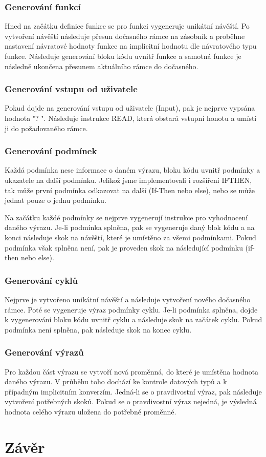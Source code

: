 \documentclass[11pt,a4paper]{article}
\begin{document}
    \subsubsection{Generování funkcí}
    Hned na začátku definice funkce se pro funkci vygeneruje unikátní návěští. Po vytvoření návěští následuje přesun dočasného rámce na zásobník a proběhne nastavení návratové hodnoty funkce na implicitní hodnotu dle návratového typu funkce. Následuje generování bloku kódu uvnitř funkce a samotná funkce je následně ukončena přesunem aktuálního rámce do dočasného.

    \subsubsection{Generování vstupu od uživatele}
    Pokud dojde na generování vstupu od uživatele (Input), pak je nejprve vypsána hodnota "? ". Následuje instrukce READ, která obstará vstupní honotu a umístí ji do požadovaného rámce.

    \subsubsection{Generování podmínek}
    Každá podmínka nese informace o daném výrazu, bloku kódu uvnitř podmínky a ukazatele na další podmínku. Jelikož jsme implementovali i rozšíření IFTHEN, tak může první podmínka odkazovat na další (If-Then nebo else), nebo se může jednat pouze o jednu podmínku.

    Na začátku každé podmínky se nejprve vygenerují instrukce pro vyhodnocení daného výrazu. Je-li podmínka splněna, pak se vygeneruje daný blok kódu a na konci následuje skok na návěští, které je umístěno za všemi podmínkami. Pokud podmínka však splněna není, pak je proveden skok na následující podmínku (if-then nebo else).

    \subsubsection{Generování cyklů}
    Nejprve je vytvořeno unikátní návěští a následuje vytvoření nového dočasného rámce. Poté se vygeneruje výraz podmínky cyklu. Je-li podmínka splněna, dojde k vygenerování bloku kódu uvnitř cyklu a následuje skok na začátek cyklu. Pokud podmínka není splněna, pak následuje skok na konec cyklu.

    \subsubsection{Generování výrazů}
    Pro každou část výrazu se vytvoří nová proměnná, do které je umístěna hodnota daného výrazu. V průběhu toho dochází ke kontrole datových typů a k případným implicitním konverzím.
    Jedná-li se o pravdivostní výraz, pak následuje vytvoření potřebných skoků. Pokud se o pravdivostní výraz nejedná, je výsledná hodnota celého výrazu uložena do potřebné proměnné.

    \newpage
    


\section{Závěr}
\end{document}
